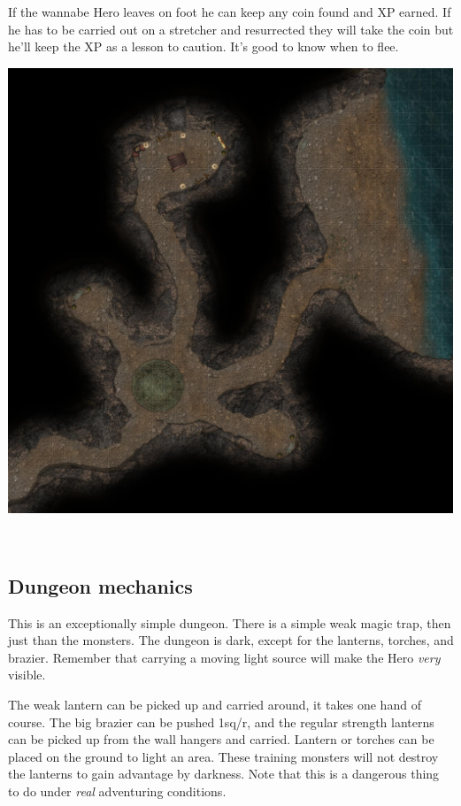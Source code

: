 \noindent
If the wannabe Hero leaves on foot he can keep any coin found and XP earned. If he has to be carried out on a stretcher and resurrected they will take the coin but he'll keep the XP as a lesson to caution. It's good to know when to flee.




\clearpage %

\noindent
\includegraphics[width=0.999\textwidth]{./map/cave.jpg}

\


\subsection*{Dungeon mechanics}

This is an exceptionally simple dungeon. There is a simple weak magic trap, then just than the monsters. The dungeon is dark, except for the lanterns, torches, and brazier. Remember that carrying a moving light source will make the Hero \emph{very} visible.

The weak lantern can be picked up and carried around, it takes one hand of course. The big brazier can be pushed 1sq/r, and the regular strength lanterns can be picked up from the wall hangers and carried. Lantern or torches can be placed on the ground to light an area. These training monsters will not destroy the lanterns to gain advantage by darkness. Note that this is a dangerous thing to do under \emph{real} adventuring conditions.

